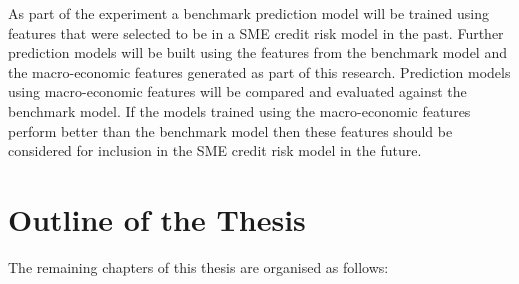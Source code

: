 As part of the experiment a benchmark prediction model will be trained using features that were selected to be in a SME credit risk model in the past. Further prediction models will be built using the features from the benchmark model and the macro-economic features generated as part of this research. Prediction models using macro-economic features will be compared and evaluated against the benchmark model. If the models trained using the  macro-economic features perform better than the benchmark model then these features should be considered for inclusion in the SME credit risk model in the future. 



\section{Outline of the Thesis}
The remaining chapters of this thesis are organised as follows:


